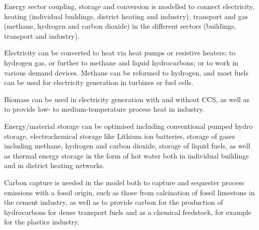 Energy sector coupling, storage and conversion is modelled to connect
electricity, heating (individual buildings, district heating and industry),
transport and gas (methane, hydrogen and carbon dioxide) in the different
sectors (buildings, transport and industry).

Electricity can be converted to heat via heat pumps or resistive heaters; to
hydrogen gas, or further to methane and liquid hydrocarbons; or to work in
various demand devices. Methane can be reformed to hydrogen, and most fuels can
be used for electricity generation in turbines or fuel cells.

Biomass can be used in electricity generation with and
without CCS, as well as to provide low- to medium-temperature process heat in
industry.

Energy/material storage can be optimised including conventional
pumped hydro storage, electrochemical storage like Lithium ion batteries,
storage of gases including methane, hydrogen and carbon dioxide, storage of
liquid fuels, as well as thermal energy storage in the form of hot water both in
individual buildings and in district heating networks.

Carbon capture is
needed in the model both to capture and sequester process emissions with a
fossil origin, such as those from calcination of fossil limestone in the cement
industry, as well as to provide carbon for the production of hydrocarbons for
dense transport fuels and as a chemical feedstock, for example for the plastics
industry.